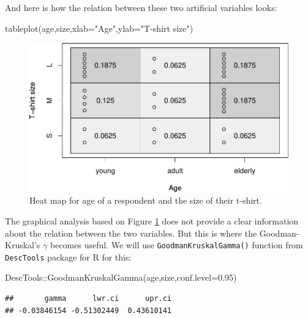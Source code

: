 \documentclass[
]{book}
\newenvironment{Shaded}{\begin{snugshade}}{\end{snugshade}}
\newcommand{\AttributeTok}[1]{\textcolor[rgb]{0.77,0.63,0.00}{#1}}
\newcommand{\FloatTok}[1]{\textcolor[rgb]{0.00,0.00,0.81}{#1}}
\newcommand{\FunctionTok}[1]{\textcolor[rgb]{0.00,0.00,0.00}{#1}}
\newcommand{\NormalTok}[1]{#1}
\newcommand{\SpecialCharTok}[1]{\textcolor[rgb]{0.00,0.00,0.00}{#1}}
\newcommand{\StringTok}[1]{\textcolor[rgb]{0.31,0.60,0.02}{#1}}
\theoremstyle{definition}
\theoremstyle{definition}
\theoremstyle{definition}
\theoremstyle{definition}
\theoremstyle{remark}
\begin{document}
And here is how the relation between these two artificial variables looks:

\begin{Shaded}
\begin{Highlighting}[]
\FunctionTok{tableplot}\NormalTok{(age,size,}\AttributeTok{xlab=}\StringTok{"Age"}\NormalTok{,}\AttributeTok{ylab=}\StringTok{"T{-}shirt size"}\NormalTok{)}
\end{Highlighting}
\end{Shaded}

\begin{figure}
\centering
\includegraphics{Svetunkov---Statistics-for-Business-Analytics_files/figure-latex/tableplotAgeSize-1.pdf}
\caption{\label{fig:tableplotAgeSize}Heat map for age of a respondent and the size of their t-shirt.}
\end{figure}

The graphical analysis based on Figure \ref{fig:tableplotAgeSize} does not provide a clear information about the relation between the two variables. But this is where the Goodman-Kruskal's \(\gamma\) becomes useful. We will use \texttt{GoodmanKruskalGamma()} function from \texttt{DescTools} package for R for this:

\begin{Shaded}
\begin{Highlighting}[]
\NormalTok{DescTools}\SpecialCharTok{::}\FunctionTok{GoodmanKruskalGamma}\NormalTok{(age,size,}\AttributeTok{conf.level=}\FloatTok{0.95}\NormalTok{)}
\end{Highlighting}
\end{Shaded}

\begin{verbatim}
##       gamma      lwr.ci      upr.ci 
## -0.03846154 -0.51302449  0.43610141
\end{verbatim}
\end{document}
